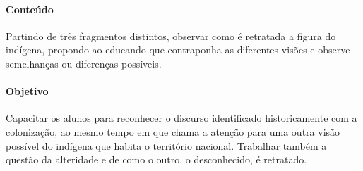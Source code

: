 \documentclass{extrarticle}
\begin{document}
\paragraph{Conteúdo}  
Partindo de três fragmentos distintos, observar como é retratada a
figura do indígena, propondo ao educando que contraponha as diferentes
visões e observe semelhanças ou diferenças possíveis.

\paragraph{Objetivo}
Capacitar os alunos para reconhecer o discurso identificado
historicamente com a colonização, ao mesmo tempo em que chama a
atenção para uma outra visão possível do indígena que habita o
território nacional. Trabalhar também a questão da alteridade e de
como o outro, o desconhecido, é retratado.
\end{document}
